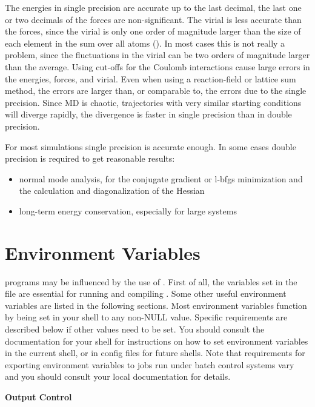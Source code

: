 The energies in single precision are accurate up to the last decimal,
the last one or two decimals of the forces are non-significant.
The virial is less accurate than the forces, since the virial is only one
order of magnitude larger than the size of each element in the sum over
all atoms ().
In most cases this is not really a problem, since the fluctuations in the
virial can be two orders of magnitude larger than the average.
Using cut-offs for the Coulomb interactions cause large errors
in the energies, forces, and virial.
Even when using a reaction-field or lattice sum method, the errors
are larger than, or comparable to, the errors due to the single precision.
Since MD is chaotic, trajectories with very similar starting conditions will
diverge rapidly, the divergence is faster in single precision than in double
precision.

For most simulations single precision is accurate enough.
In some cases double precision is required to get reasonable results:
\begin{itemize}
\item normal mode analysis,
for the conjugate gradient or l-bfgs minimization and the calculation and
diagonalization of the Hessian
\item long-term energy conservation, especially for large systems
\end{itemize}

\section{Environment Variables}
{\gromacs} programs may be influenced by the use of
.  First of all, the variables set in
the {\tt {}} file are essential for running and
compiling {\gromacs}. Some other useful environment variables are
listed in the following sections. Most environment variables function
by being set in your shell to any non-NULL value. Specific
requirements are described below if other values need to be set. You
should consult the documentation for your shell for instructions on
how to set environment variables in the current shell, or in config
files for future shells. Note that requirements for exporting
environment variables to jobs run under batch control systems vary and
you should consult your local documentation for details.

{\bf Output Control}

